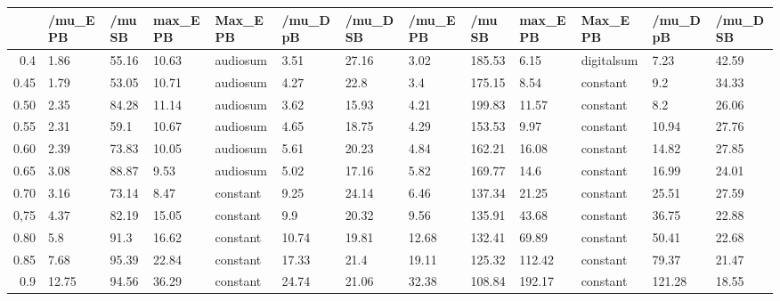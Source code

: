 \begin{table}[ht]
\centering
\begin{tabular}{rllllllllllll}
  \hline
 & /mu\_E PB & /mu SB & max\_E PB & Max\_E PB & /mu\_D pB & /mu\_D SB & /mu\_E PB & /mu SB & max\_E PB & Max\_E PB & /mu\_D pB & /mu\_D SB \\ 
  \hline
0.4 & 1.86 & 55.16 & 10.63 & audiosum & 3.51 & 27.16 & 3.02 & 185.53 & 6.15 & digitalsum & 7.23 & 42.59 \\ 
  0.45 & 1.79 & 53.05 & 10.71 & audiosum & 4.27 & 22.8 & 3.4 & 175.15 & 8.54 & constant & 9.2 & 34.33 \\ 
  0.50 & 2.35 & 84.28 & 11.14 & audiosum & 3.62 & 15.93 & 4.21 & 199.83 & 11.57 & constant & 8.2 & 26.06 \\ 
  0.55 & 2.31 & 59.1 & 10.67 & audiosum & 4.65 & 18.75 & 4.29 & 153.53 & 9.97 & constant & 10.94 & 27.76 \\ 
  0.60 & 2.39 & 73.83 & 10.05 & audiosum & 5.61 & 20.23 & 4.84 & 162.21 & 16.08 & constant & 14.82 & 27.85 \\ 
  0.65 & 3.08 & 88.87 & 9.53 & audiosum & 5.02 & 17.16 & 5.82 & 169.77 & 14.6 & constant & 16.99 & 24.01 \\ 
  0.70 & 3.16 & 73.14 & 8.47 & constant & 9.25 & 24.14 & 6.46 & 137.34 & 21.25 & constant & 25.51 & 27.59 \\ 
  0,75 & 4.37 & 82.19 & 15.05 & constant & 9.9 & 20.32 & 9.56 & 135.91 & 43.68 & constant & 36.75 & 22.88 \\ 
  0.80 & 5.8 & 91.3 & 16.62 & constant & 10.74 & 19.81 & 12.68 & 132.41 & 69.89 & constant & 50.41 & 22.68 \\ 
  0.85 & 7.68 & 95.39 & 22.84 & constant & 17.33 & 21.4 & 19.11 & 125.32 & 112.42 & constant & 79.37 & 21.47 \\ 
  0.9 & 12.75 & 94.56 & 36.29 & constant & 24.74 & 21.06 & 32.38 & 108.84 & 192.17 & constant & 121.28 & 18.55 \\ 
   \hline
\end{tabular}
\end{table}
